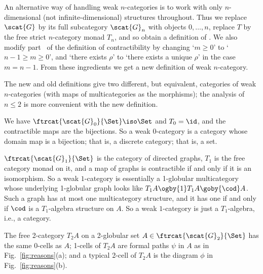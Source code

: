 \clearpage


\lowdimsheading{\lp}

An alternative way of handling weak $n$-categories is to work with only
$n$-dimensional (not infinite-dimensional) structures throughout.  Thus we
replace $\scat{G}$ by its full subcategory $\scat{G}_n$ with objects $0,
\ldots, n$, replace $T$ by the free strict $n$-category monad $T_n$, and so
obtain a definition of .  We also modify
part~ of the definition of contractibility by changing
`$m\geq 0$' to `$n-1\geq m\geq 0$', and `there exists $\rho$' to `there
exists a unique $\rho$' in the case $m=n-1$.  From these ingredients we get a
new definition of weak $n$-category.

The new and old definitions give two different, but equivalent, categories of
weak $n$-categories (with maps of multicategories as the morphisms); the
analysis of $n\leq 2$ is more convenient with the new definition.



We have $\ftrcat{\scat{G}_0}{\Set} \iso \Set$ and $T_0=\id$, and the
contractible maps are the bijections.  So a weak $0$-category is a category
whose domain map is a bijection; that is, a discrete category; that is,
a set.



$\ftrcat{\scat{G}_1}{\Set}$ is the category of directed graphs, $T_1$ is the
free category monad on it, and a map of graphs is contractible if and only if
it is an isomorphism.  So a weak $1$-category is essentially a 1-globular
multicategory whose underlying 1-globular graph looks like $T_1 A \ogby{1}
T_1 A \goby{\cod} A$.  Such a graph has at most one multicategory structure,
and it has one if and only if $\cod$ is a $T_1$-algebra structure on $A$.  So
a weak $1$-category is just a $T_1$-algebra, i.e., a category.



The free 2-category $T_2 A$ on a 2-globular set $A \in
\ftrcat{\scat{G}_2}{\Set}$ has the same 0-cells as $A$; 1-cells of $T_2 A$
are formal paths $\psi$ in $A$ as in Fig.~\ref{fig:reasons}(a); and a typical
2-cell of $T_2 A$ is the diagram $\phi$ in Fig.~\ref{fig:reasons}(b).

